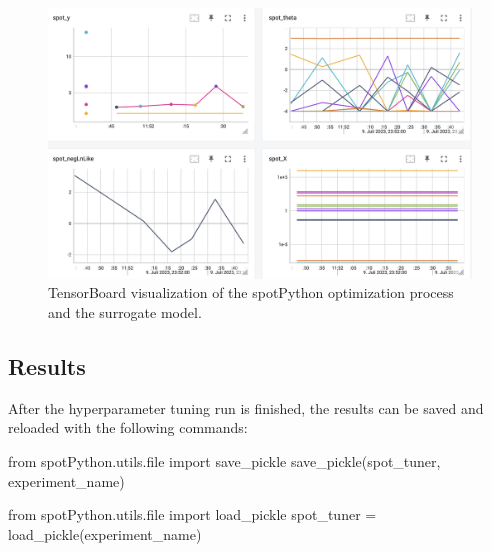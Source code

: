 \documentclass[
  letterpaper,
  DIV=11,
  numbers=noendperiod]{scrreprt}
\newenvironment{Shaded}{\begin{snugshade}}{\end{snugshade}}
\newcommand{\BuiltInTok}[1]{\textcolor[rgb]{0.00,0.23,0.31}{#1}}
\newcommand{\ImportTok}[1]{\textcolor[rgb]{0.00,0.46,0.62}{#1}}
\newcommand{\NormalTok}[1]{\textcolor[rgb]{0.00,0.23,0.31}{#1}}
\newcommand{\OperatorTok}[1]{\textcolor[rgb]{0.37,0.37,0.37}{#1}}
\begin{document}
\begin{figure}

{\centering \includegraphics[width=1\textwidth,height=\textheight]{figures_static/13_tensorboard_01.png}

}

\caption{TensorBoard visualization of the spotPython optimization
process and the surrogate model.}

\end{figure}

\hypertarget{results-4}{%
\subsection{Results}\label{results-4}}

After the hyperparameter tuning run is finished, the results can be
saved and reloaded with the following commands:

\begin{Shaded}
\begin{Highlighting}[]
\ImportTok{from}\NormalTok{ spotPython.utils.}\BuiltInTok{file} \ImportTok{import}\NormalTok{ save\_pickle}
\NormalTok{save\_pickle(spot\_tuner, experiment\_name)}
\end{Highlighting}
\end{Shaded}

\begin{Shaded}
\begin{Highlighting}[]
\ImportTok{from}\NormalTok{ spotPython.utils.}\BuiltInTok{file} \ImportTok{import}\NormalTok{ load\_pickle}
\NormalTok{spot\_tuner }\OperatorTok{=}\NormalTok{ load\_pickle(experiment\_name)}
\end{Highlighting}
\end{Shaded}
\end{document}
